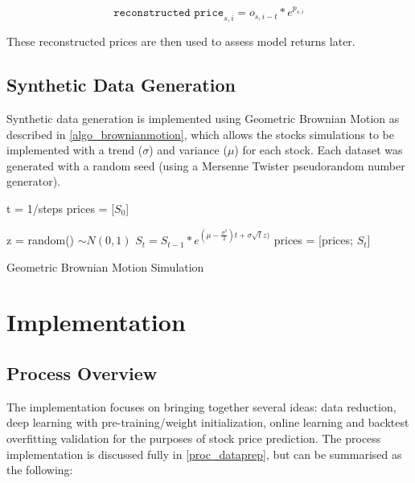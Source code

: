 \documentclass[a4paper,11pt,oneside]{article}
\theoremstyle{plain}
\theoremstyle{definition}
\begin{document}
\begin{equation}
\texttt{reconstructed price}_{s,i} = o_{s,i-t} * e^{p_{s,i}}
\end{equation}

These reconstructed prices are then used to assess model returns later.

\subsection{Synthetic Data Generation}\label{data_synthetic}

Synthetic data generation is implemented using Geometric Brownian Motion as described in \ref{algo_brownianmotion}, which allows the stocks simulations to be implemented with a trend ($\sigma$) and variance ($\mu$) for each stock. Each dataset was generated with a random seed (using a Mersenne Twister pseudorandom number generator). \newline

\begin{algorithm}[H]

	t = 1/steps\;
	prices = [$S_0$]\;

	{
		z = random()  $\sim N(0,1)$\;
		$S_t = S_{t-1}*e^{(\mu - \frac {\sigma^2}{2})t + \sigma  \sqrt{t}  z)}$\;
		prices = [prices; $S_t$]\;
	}
	\label{algo_brownianmotion}
	\caption{Geometric Brownian Motion Simulation}
\end{algorithm}




\newpage
\section{Implementation}\label{Implementation}
\subsection{Process Overview}\label{ProcessOverview}\label{imp_overview}


The implementation focuses on bringing together several ideas: data reduction, deep learning with pre-training/weight initialization, online learning and backtest overfitting validation for the purposes of stock price prediction. The process implementation is discussed fully in \ref{proc_dataprep}, but can be summarised as the following:
\end{document}
